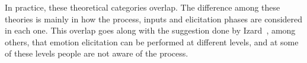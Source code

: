 In practice, these theoretical categories overlap. The difference among these theories is mainly in how the process, inputs and elicitation phases are considered in each one. This overlap goes along with the suggestion done by Izard~\cite{Izard1993}, among others, that emotion elicitation can be performed at different levels, and at some of these levels people are not aware of the process. 